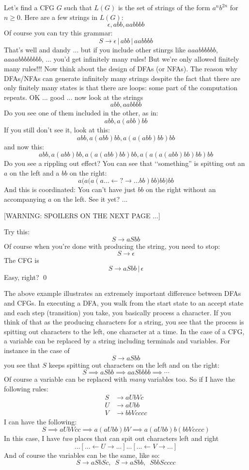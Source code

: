 \newpage
\begin{eg}
Let's find a CFG $G$ such that $L(G)$ is the set of strings of the form
$a^n b^{2n}$ for $n \geq 0$.
Here are a few strings in $L(G)$:
\[
\epsilon, abb, aabbbb
\]
Of course you can try this grammar:
\[
S \rightarrow \epsilon \,|\, abb \,|\, aabbbb
\]
That's well and dandy ... but if you include other stinrgs like
$aaabbbbbb$, $aaaabbbbbbbb$, ... you'd get infinitely many rules!
But we're only allowed finitely many rules!!!
Now think about the design of DFAs (or NFAs).
The reason why DFAs/NFAs can generate infinitely many strings despite
the fact that there are only finitely many states is that there are loops:
some part of the computation repeats.
OK ... good ... now look at the strings
\[
abb, aabbbb
\]
Do you see one of them included in the other, as in:
\[
abb, a(abb)bb
\]
If you still don't see it, look at this:
\[
abb, a(abb)bb, a(a(abb)bb)bb
\]
and now this:
\[
abb, a(abb)bb, a(a(abb)bb)bb, a(a(a(abb)bb)bb)bb
\]
Do you see a rippling out effect?
You can see that \lq\lq something'' is spitting out an $a$ on the left
and a $bb$ on the right:
\[
a \biggl( a \bigl( a (a\ldots \leftarrow ? \rightarrow \ldots
bb )
bb \bigr)
bb \biggr)
bb
\]
And this is coordinated: You can't have just $bb$ on the right without
an accompanying $a$ on the left. See it yet? ...

[WARNING: SPOILERS ON THE NEXT PAGE ...]

\newpage
Try this:
\[
S \rightarrow a S bb
\]
Of course when you're done with producing the string, you need to stop:
\[
S \rightarrow \epsilon
\]
The CFG is
\[
S \rightarrow a S bb \,|\, \epsilon
\]
Easy, right?
\qed
\end{eg}

\newpage
The above example illustrates an extremely important difference between DFAs
and CFGs.
In executing a DFA, you walk from the start state to an accept state and
each step (transition) you take, you basically process a character.
If you think of that as the producing characters for a string, you see that
the process is spitting out characters to the left, one character at a time.
In the case of a CFG, a variable can be replaced by a string including
terminals and variables.
For instance in the case of 
\[
S \rightarrow a S bb
\]
you see that $S$ keeps spitting out characters on the left and on the right:
\[
S \implies aSbb \implies aaSbbbb \implies \cdots
\]
Of course a variable can be replaced with \textit{many} variables too.
So if I have the following rules:
\begin{align*}
S &\rightarrow aUbVc \\
U &\rightarrow aUbb \\
V &\rightarrow bbVcccc
\end{align*}
I can have the following:
\[
S
\implies aUbVcc
\implies a(aUbb)bV
\implies a(aUbb)b(bbVcccc)
\]
In this case, I have \textit{ two} places that can spit out characters left
and right
\[
...[... \leftarrow U \rightarrow ...]...[...\leftarrow V \rightarrow ...]
\]
And of course the variables can be the same, like so:
\[
S \rightarrow aSbSc, \,\,\, S \rightarrow aSbb, \,\,\, S bbScccc
\]

